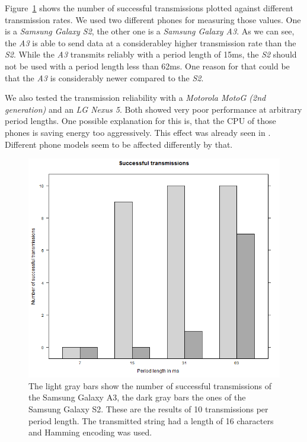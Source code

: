 \documentclass{sig-alternate} %
\begin{document}
Figure~\ref{fig:successful_transmissions} shows the number of successful transmissions plotted against different transmission rates.
We used two different phones for measuring those values.
One is a \textit{Samsung Galaxy S2}, the other one is a \textit{Samsung Galaxy A3}.
As we can see, the \textit{A3} is able to send data at a considerabley higher transmission rate than the \textit{S2}.
While the \textit{A3} transmits reliably with a period length of 15ms, the \textit{S2} should not be used with a period length less than 62ms.
One reason for that could be that the \textit{A3} is considerably newer compared to the \textit{S2}.

We also tested the transmission reliability with a \textit{Motorola MotoG (2nd generation)} and an \textit{LG Nexus 5}.
Both showed very poor performance at arbitrary period lengths.
One possible explanation for this is, that the CPU of those phones is saving energy too aggressively.
This effect was already seen in \cite{mongia2010reliable}.
Different phone models seem to be affected differently by that.

\begin{figure}
	\centering
	\includegraphics[scale=.35]{images/successful-transmissions.png}
	\caption{The light gray bars show the number of successful transmissions of the Samsung Galaxy A3, the dark gray bars the ones of the Samsung Galaxy S2. These are the results of 10 transmissions per period length. The transmitted string had a length of 16 characters and Hamming encoding was used.}
	\label{fig:successful_transmissions}
\end{figure}
\end{document}
